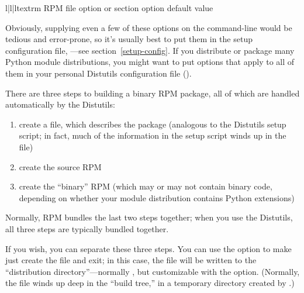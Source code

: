 \documentclass{manual}
\begin{document}
\begin{tableiii}{l|l|l}{textrm}%
  {RPM  file option or section}%
  { option}%
  {default value}
\end{tableiii}

Obviously, supplying even a few of these options on the command-line
would be tedious and error-prone, so it's usually best to put them in
the setup configuration file, ---see
section~\ref{setup-config}.  If you distribute or package many Python
module distributions, you might want to put options that apply to all of
them in your personal Distutils configuration file
().

There are three steps to building a binary RPM package, all of which are 
handled automatically by the Distutils:

\begin{enumerate}
\item create a  file, which describes the package (analogous 
  to the Distutils setup script; in fact, much of the information in the 
  setup script winds up in the  file)
\item create the source RPM
\item create the ``binary'' RPM (which may or may not contain binary
  code, depending on whether your module distribution contains Python
  extensions)
\end{enumerate}

Normally, RPM bundles the last two steps together; when you use the
Distutils, all three steps are typically bundled together.

If you wish, you can separate these three steps.  You can use the
 option to make  just
create the  file and exit; in this case, the 
file will be written to the ``distribution directory''---normally
, but customizable with the 
option.  (Normally, the  file winds up deep in the ``build
tree,'' in a temporary directory created by .)
\end{document}
